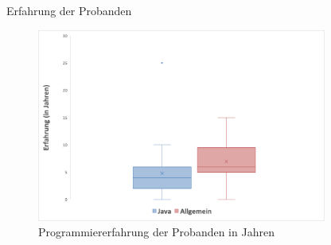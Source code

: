 \documentclass[10pt]{beamer}
\begin{document}
	\begin{frame}{Erfahrung der Probanden}
		\begin{figure}
			\includegraphics[width=0.85\textwidth]{graphics/box_experience_years.png}
			\caption{
				\label{fig:box_experience_years.png} 
			Programmiererfahrung der Probanden in Jahren
			}
		\end{figure}
	\end{frame}
\end{document}
